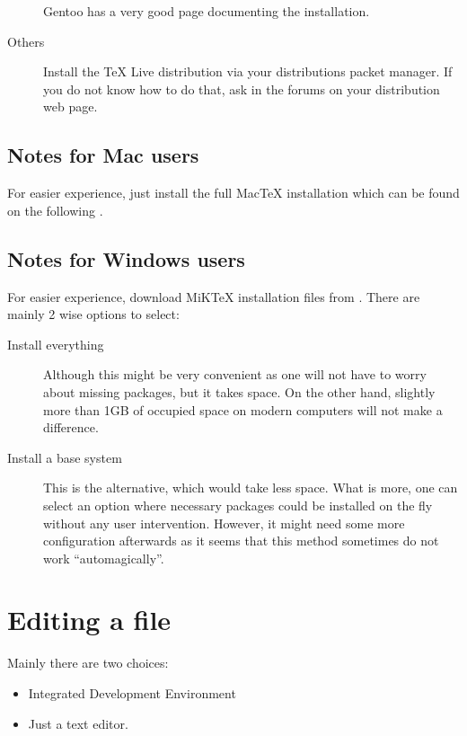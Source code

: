 \documentclass[
    draft
]{scrartcl}
\newcommand{\MiKTeX}{MiK\TeX}
\newcommand{\MacTeX}{Mac\TeX}
\begin{document}
\begin{description}
        Gentoo has a very good
        page documenting the installation.
    \item[Others]
        Install the \TeX{} Live distribution via your distributions packet
        manager. If you do not know how to do that, ask in the forums on your
        distribution web page.
\end{description}

\subsection{Notes for Mac users}

For easier experience, just install the full \MacTeX{} installation which can be
found on the following .

\subsection{Notes for Windows users}

For easier experience, download \MiKTeX{} installation files from
.
There are mainly 2 wise options to select:
\begin{description}
    \item[Install everything] Although this might be very convenient as
            one will not have to worry about missing packages, but it takes
            space.
        On the other hand, slightly more than 1GB of occupied space on modern
            computers will not make a difference.
    \item[Install a base system] This is the alternative, which would take less
            space. 
        What is more, one can select an option where necessary packages
            could be installed on the fly without any user intervention.
        However, it might need some more configuration afterwards as it seems
            that this method sometimes do not work ``automagically''.
\end{description}

\section{Editing a  file}

Mainly there are two choices:
\begin{itemize}
    \item Integrated Development Environment
    \item Just a text editor.
\end{itemize}
\end{document}
